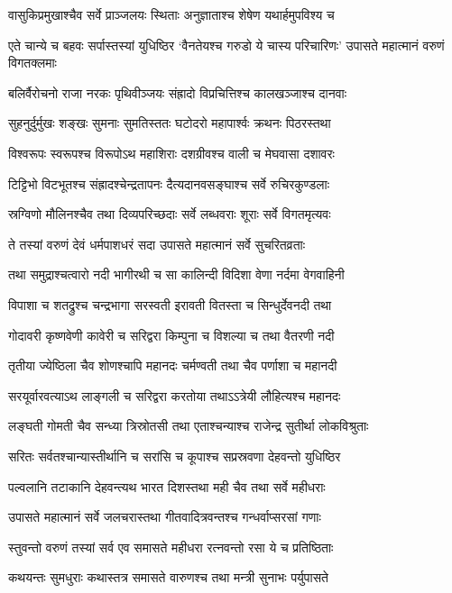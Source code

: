\twolineshloka
{वासुकिप्रमुखाश्चैव सर्वे प्राञ्जलयः स्थिताः}
{अनुज्ञाताश्च शेषेण यथार्हमुपविश्य च}


\threelineshloka
{एते चान्ये च बहवः सर्पास्तस्यां युधिष्ठिर}
{`वैनतेयश्च गरुडो ये चास्य परिचारिणः'}
{उपासते महात्मानं वरुणं विगतक्लमाः}


\twolineshloka
{बलिर्वैरोचनो राजा नरकः पृथिवीञ्जयः}
{संह्रादो विप्रचित्तिश्च कालखञ्जाश्च दानवाः}


\twolineshloka
{सुहनुर्दुर्मुखः शङ्खः सुमनाः सुमतिस्ततः}
{घटोदरो महापार्श्वः क्रथनः पिठरस्तथा}


\twolineshloka
{विश्वरूपः स्वरूपश्च विरूपोऽथ महाशिराः}
{दशग्रीवश्च वाली च मेघवासा दशावरः}


\twolineshloka
{टिट्टिभो विटभूतश्च संह्रादश्चेन्द्रतापनः}
{दैत्यदानवसङ्घाश्च सर्वे रुचिरकुण्डलाः}


\twolineshloka
{स्रग्विणो मौलिनश्चैव तथा दिव्यपरिच्छदाः}
{सर्वे लब्धवराः शूराः सर्वे विगतमृत्यवः}


\twolineshloka
{ते तस्यां वरुणं देवं धर्मपाशधरं सदा}
{उपासते महात्मानं सर्वे सुचरितव्रताः}


\twolineshloka
{तथा समुद्राश्चत्वारो नदी भागीरथी च सा}
{कालिन्दी विदिशा वेणा नर्दमा वेगवाहिनी}


\twolineshloka
{विपाशा च शतद्रुश्च चन्द्रभागा सरस्वती}
{इरावती वितस्ता च सिन्धुर्देवनदी तथा}


\twolineshloka
{गोदावरी कृष्णवेणी कावेरी च सरिद्वरा}
{किम्पुना च विशल्या च तथा वैतरणी नदी}


\twolineshloka
{तृतीया ज्येष्ठिला चैव शोणश्चापि महानदः}
{चर्मण्वती तथा चैव पर्णाशा च महानदी}


\twolineshloka
{सरयूर्वारवत्याऽथ लाङ्गली च सरिद्वरा}
{करतोया तथाऽऽत्रेयी लौहित्यश्च महानदः}


\twolineshloka
{लङ्घती गोमती चैव सन्ध्या त्रिस्रोतसी तथा}
{एताश्चन्याश्च राजेन्द्र सुतीर्था लोकविश्रुताः}


\threelineshloka
{सरितः सर्वतश्चान्यास्तीर्थानि च सरांसि च}
{कूपाश्च सप्रस्रवणा देहवन्तो युधिष्ठिर}
{}


\twolineshloka
{पल्वलानि तटाकानि देहवन्त्यथ भारत}
{दिशस्तथा मही चैव तथा सर्वे महीधराः}


\twolineshloka
{उपासते महात्मानं सर्वे जलचरास्तथा}
{गीतवादित्रवन्तश्च गन्धर्वाप्सरसां गणाः}


\twolineshloka
{स्तुवन्तो वरुणं तस्यां सर्व एव समासते}
{महीधरा रत्नवन्तो रसा ये च प्रतिष्ठिताः}


\twolineshloka
{कथयन्तः सुमधुराः कथास्तत्र समासते}
{वारुणश्च तथा मन्त्री सुनाभः पर्युपासते}


